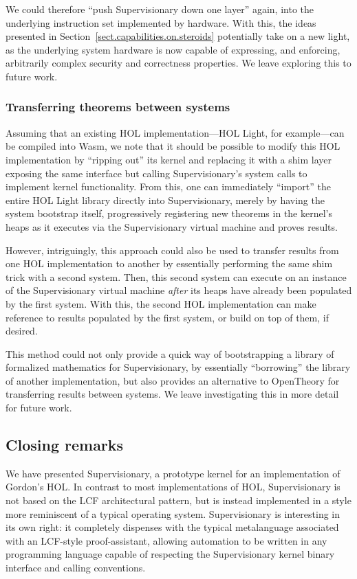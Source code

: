 \documentclass[a4paper, UKenglish, cleveref, autoref, thm-restate, colorlinks]{lipics-v2021}
\begin{document}
We could therefore ``push Supervisionary down one layer'' again, into the underlying instruction set implemented by hardware.
With this, the ideas presented in Section~\ref{sect.capabilities.on.steroids} potentially take on a new light, as the underlying system hardware is now capable of expressing, and enforcing, arbitrarily complex security and correctness properties.
We leave exploring this to future work.

\subsubsection*{Transferring theorems between systems}

Assuming that an existing HOL implementation---HOL Light, for example---can be compiled into Wasm, we note that it should be possible to modify this HOL implementation by ``ripping out'' its kernel and replacing it with a shim layer exposing the same interface but calling Supervisionary's system calls to implement kernel functionality.
From this, one can immediately ``import'' the entire HOL Light library directly into Supervisionary, merely by having the system bootstrap itself, progressively registering new theorems in the kernel's heaps as it executes via the Supervisionary virtual machine and proves results.

However, intriguingly, this approach could also be used to transfer results from one HOL implementation to another by essentially performing the same shim trick with a second system.
Then, this second system can execute on an instance of the Supervisionary virtual machine \emph{after} its heaps have already been populated by the first system.
With this, the second HOL implementation can make reference to results populated by the first system, or build on top of them, if desired.

This method could not only provide a quick way of bootstrapping a library of formalized mathematics for Supervisionary, by essentially ``borrowing'' the library of another implementation, but also provides an alternative to OpenTheory for transferring results between systems.
We leave investigating this in more detail for future work.

\subsection{Closing remarks}

We have presented Supervisionary, a prototype kernel for an implementation of Gordon's HOL.
In contrast to most implementations of HOL, Supervisionary is not based on the LCF architectural pattern, but is instead implemented in a style more reminiscent of a typical operating system.
Supervisionary is interesting in its own right: it completely dispenses with the typical metalanguage associated with an LCF-style proof-assistant, allowing automation to be written in any programming language capable of respecting the Supervisionary kernel binary interface and calling conventions.
\end{document}
